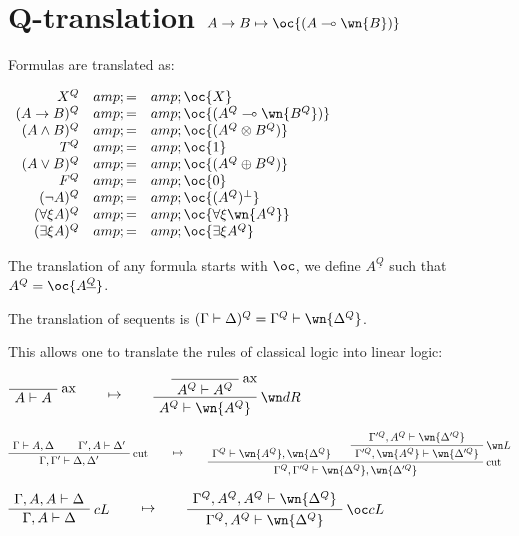 \section{\texorpdfstring{Q-translation \(A\imp B \mapsto \oc{(A\limp\wn{B})}\)}{Q-translation A\textbackslash{}imp B \textbackslash{}mapsto \textbackslash{}oc\{(A\textbackslash{}limp\textbackslash{}wn\{B\})\}}}\label{q-translation-aimp-b-mapsto-ocalimpwnb}

Formulas are translated as:

\(\begin{array}{rcl}
X^Q &amp; = &amp; \oc{X} \\
(A\imp B)^Q &amp; = &amp; \oc{(A^Q\limp\wn{B^Q})} \\
(A\wedge B)^Q &amp; = &amp; \oc{(A^Q \tens B^Q)} \\
T^Q &amp; = &amp; \oc{\one} \\
(A\vee B)^Q &amp; = &amp; \oc{(A^Q\plus B^Q)} \\
F^Q &amp; = &amp; \oc{\zero} \\
(\neg A)^Q &amp; = &amp; \oc{(A^Q)\orth} \\
(\forall\xi A)^Q &amp; = &amp; \oc{\forall\xi \wn{A^Q}} \\
(\exists\xi A)^Q &amp; = &amp; \oc{\exists\xi A^Q}
\end{array}\)

The translation of any formula starts with \(\oc\), we define
\(A^{\underline{Q}}\) such that \(A^Q=\oc{A^{\underline{Q}}}\).

The translation of sequents is
\((\Gamma\vdash\Delta)^Q = \Gamma^Q\vdash\wn{\Delta^Q}\).

This allows one to translate the rules of classical logic into linear
logic:

\(\LabelRule{\rulename{ax}}
\NulRule{A\vdash A}
\DisplayProof
\qquad\mapsto\qquad
\LabelRule{\rulename{ax}}
\NulRule{A^Q\vdash A^Q}
\LabelRule{\wn d R}
\UnaRule{A^Q\vdash \wn{A^Q}}
\DisplayProof\)

\(\AxRule{\Gamma\vdash A,\Delta}
\AxRule{\Gamma',A\vdash \Delta'}
\LabelRule{\rulename{cut}}
\BinRule{\Gamma,\Gamma'\vdash \Delta,\Delta'}
\DisplayProof
\qquad\mapsto\qquad
\AxRule{\Gamma^Q\vdash \wn{A^Q},\wn{\Delta^Q}}
\AxRule{\Gamma'^Q,A^Q\vdash \wn{\Delta'^Q}}
\LabelRule{\wn L}
\UnaRule{\Gamma'^Q,\wn{A^Q}\vdash \wn{\Delta'^Q}}
\LabelRule{\rulename{cut}}
\BinRule{\Gamma^Q,\Gamma'^Q\vdash \wn{\Delta^Q},\wn{\Delta'^Q}}
\DisplayProof\)

\(\AxRule{\Gamma,A,A\vdash \Delta}
\LabelRule{c L}
\UnaRule{\Gamma,A\vdash \Delta}
\DisplayProof
\qquad\mapsto\qquad
\AxRule{\Gamma^Q,A^Q,A^Q\vdash \wn{\Delta^Q}}
\LabelRule{\oc c L}
\UnaRule{\Gamma^Q,A^Q\vdash \wn{\Delta^Q}}
\DisplayProof\)


